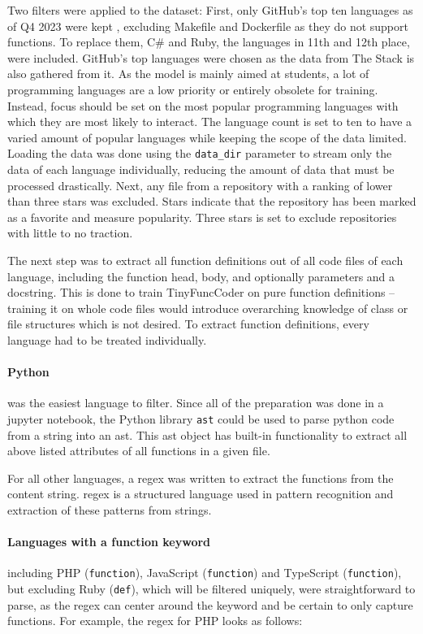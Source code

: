 Two filters were applied to the dataset:
First, only GitHub's top ten languages as of Q4 2023 were kept \cite{GitHub.2024}, excluding Makefile and Dockerfile as they do not support functions.
To replace them, C\# and Ruby, the languages in 11th and 12th place, were included.
GitHub's top languages were chosen as the data from The Stack is also gathered from it.
As the model is mainly aimed at students, a lot of programming languages are a low priority or entirely obsolete for training.
Instead, focus should be set on the most popular programming languages with which they are most likely to interact.
The language count is set to ten to have a varied amount of popular languages while keeping the scope of the data limited.
Loading the data was done using the \texttt{data\_dir} parameter to stream only the data of each language individually, reducing the amount of data that must be processed drastically.
Next, any file from a repository with a ranking of lower than three stars was excluded.
Stars indicate that the repository has been marked as a favorite and measure popularity.
Three stars is set to exclude repositories with little to no traction.

The next step was to extract all function definitions out of all code files of each language, including the function head, body, and optionally parameters and a docstring.
This is done to train TinyFuncCoder on pure function definitions -- training it on whole code files would introduce overarching knowledge of class or file structures which is not desired.
To extract function definitions, every language had to be treated individually.

\paragraph{Python} was the easiest language to filter.
Since all of the preparation was done in a jupyter notebook, the Python library \texttt{ast} could be used to parse python code from a string into an \ac{ast}.
This \ac{ast} object has built-in functionality to extract all above listed attributes of all functions in a given file.

For all other languages, a \ac{regex} was written to extract the functions from the content string.
\Ac{regex} is a structured language used in pattern recognition and extraction of these patterns from strings.

\paragraph{Languages with a function keyword} including PHP (\texttt{function}), JavaScript (\texttt{function}) and TypeScript (\texttt{function}), but excluding Ruby (\texttt{def}), which will be filtered uniquely, were straightforward to parse, as the \ac{regex} can center around the keyword and be certain to only capture functions.
For example, the \ac{regex} for PHP looks as follows:

